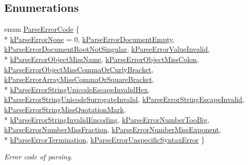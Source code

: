 \subsection*{Enumerations}
\begin{DoxyCompactItemize}
\item 
enum \hyperlink{a00832_ga8d4b32dfc45840bca189ade2bbcb6ba7}{Parse\+Error\+Code} \{ \\*
\hyperlink{a00832_gga8d4b32dfc45840bca189ade2bbcb6ba7ac0856bac4945cbd1d09e9502fd8f852f}{k\+Parse\+Error\+None} = 0, 
\hyperlink{a00832_gga8d4b32dfc45840bca189ade2bbcb6ba7a04b368d184e84b50580be2faa55f738a}{k\+Parse\+Error\+Document\+Empty}, 
\hyperlink{a00832_gga8d4b32dfc45840bca189ade2bbcb6ba7a2293b39033220f4c2a568482c497dab5}{k\+Parse\+Error\+Document\+Root\+Not\+Singular}, 
\hyperlink{a00832_gga8d4b32dfc45840bca189ade2bbcb6ba7a20a50e257aab726699ab02192db72ba9}{k\+Parse\+Error\+Value\+Invalid}, 
\\*
\hyperlink{a00832_gga8d4b32dfc45840bca189ade2bbcb6ba7ae3142fbadf2c4cdfd0c7200d7b6b8ed3}{k\+Parse\+Error\+Object\+Miss\+Name}, 
\hyperlink{a00832_gga8d4b32dfc45840bca189ade2bbcb6ba7a55cda7eb30436986ab42a61e06caf017}{k\+Parse\+Error\+Object\+Miss\+Colon}, 
\hyperlink{a00832_gga8d4b32dfc45840bca189ade2bbcb6ba7a34f70d7ed2fa121954f5fc5b5113d05f}{k\+Parse\+Error\+Object\+Miss\+Comma\+Or\+Curly\+Bracket}, 
\hyperlink{a00832_gga8d4b32dfc45840bca189ade2bbcb6ba7abfdd2bd90134fec4fe6a22762d16a5f5}{k\+Parse\+Error\+Array\+Miss\+Comma\+Or\+Square\+Bracket}, 
\\*
\hyperlink{a00832_gga8d4b32dfc45840bca189ade2bbcb6ba7afc65ea941a0a26812f0f258d2429e5d2}{k\+Parse\+Error\+String\+Unicode\+Escape\+Invalid\+Hex}, 
\hyperlink{a00832_gga8d4b32dfc45840bca189ade2bbcb6ba7ad9fced6763a06435ca448626c74e5c72}{k\+Parse\+Error\+String\+Unicode\+Surrogate\+Invalid}, 
\hyperlink{a00832_gga8d4b32dfc45840bca189ade2bbcb6ba7a98bb3f3b1e12fdb7f278b9fa4029306f}{k\+Parse\+Error\+String\+Escape\+Invalid}, 
\hyperlink{a00832_gga8d4b32dfc45840bca189ade2bbcb6ba7a6369e5b4e4922720cbc45c5941efc4af}{k\+Parse\+Error\+String\+Miss\+Quotation\+Mark}, 
\\*
\hyperlink{a00832_gga8d4b32dfc45840bca189ade2bbcb6ba7a17ecb2ed1524b513d64a93f4a7a8b456}{k\+Parse\+Error\+String\+Invalid\+Encoding}, 
\hyperlink{a00832_gga8d4b32dfc45840bca189ade2bbcb6ba7ae52aaa70fde46e4cc422420309700b82}{k\+Parse\+Error\+Number\+Too\+Big}, 
\hyperlink{a00832_gga8d4b32dfc45840bca189ade2bbcb6ba7a08a2cc2b4cacfba1673ed536eee229ce}{k\+Parse\+Error\+Number\+Miss\+Fraction}, 
\hyperlink{a00832_gga8d4b32dfc45840bca189ade2bbcb6ba7a82cdbd740e22b819a70d05e585c2a442}{k\+Parse\+Error\+Number\+Miss\+Exponent}, 
\\*
\hyperlink{a00832_gga8d4b32dfc45840bca189ade2bbcb6ba7a6fed2d9a15f88540a1ba785f0de2cbe6}{k\+Parse\+Error\+Termination}, 
\hyperlink{a00832_gga8d4b32dfc45840bca189ade2bbcb6ba7a2bec6b26bddd3e093a37fc0d6399e0be}{k\+Parse\+Error\+Unspecific\+Syntax\+Error}
 \}\begin{DoxyCompactList}\small\item\em Error code of parsing. \end{DoxyCompactList}
\end{DoxyCompactItemize}
